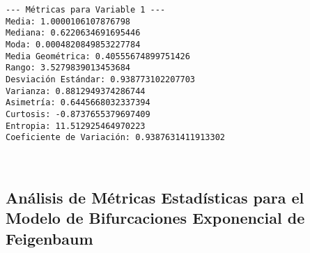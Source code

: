 \documentclass[11pt]{article}
\begin{document}
    \begin{Verbatim}[commandchars=\\\{\}]
--- Métricas para Variable 1 ---
Media: 1.0000106107876798
Mediana: 0.6220634691695446
Moda: 0.0004820849853227784
Media Geométrica: 0.40555674899751426
Rango: 3.5279839013453684
Desviación Estándar: 0.938773102207703
Varianza: 0.8812949374286744
Asimetría: 0.6445668032337394
Curtosis: -0.8737655379697409
Entropia: 11.512925464970223
Coeficiente de Variación: 0.9387631411913302

    \end{Verbatim}

    \begin{center}
    \end{center}
    { \hspace*{\fill} \\}
    
    \hypertarget{anuxe1lisis-de-muxe9tricas-estaduxedsticas-para-el-modelo-de-bifurcaciones-exponencial-de-feigenbaum}{%
\subsection{Análisis de Métricas Estadísticas para el Modelo de
Bifurcaciones Exponencial de
Feigenbaum}\label{anuxe1lisis-de-muxe9tricas-estaduxedsticas-para-el-modelo-de-bifurcaciones-exponencial-de-feigenbaum}}
\end{document}
